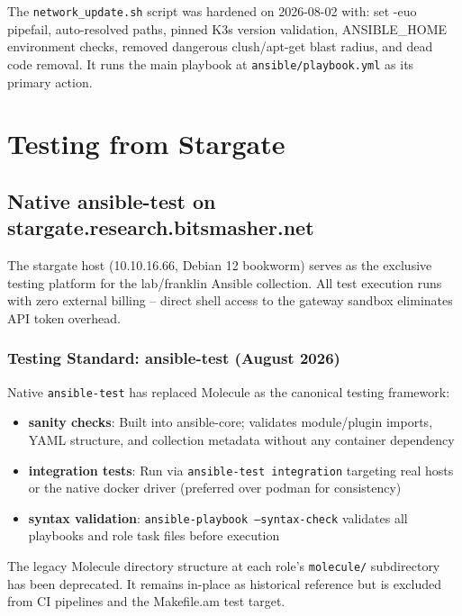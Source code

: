 The \texttt{network\_update.sh} script was hardened on 2026-08-02 with: set -euo pipefail, auto-resolved paths, pinned K3s version validation, ANSIBLE_HOME environment checks, removed dangerous clush/apt-get blast radius, and dead code removal. It runs the main playbook at \texttt{ansible/playbook.yml} as its primary action.

\chapter{Testing from Stargate}

\section{Native ansible-test on stargate.research.bitsmasher.net}

The stargate host (10.10.16.66, Debian 12 bookworm) serves as the exclusive testing platform for the lab/franklin Ansible collection. All test execution runs with zero external billing -- direct shell access to the gateway sandbox eliminates API token overhead.

\subsection{Testing Standard: ansible-test (August 2026)}

Native \texttt{ansible-test} has replaced Molecule as the canonical testing framework:

\begin{itemize}
    \item \textbf{sanity checks}: Built into ansible-core; validates module/plugin imports, YAML structure, and collection metadata without any container dependency
    
    \item \textbf{integration tests}: Run via \texttt{ansible-test integration} targeting real hosts or the native docker driver (preferred over podman for consistency)
    
    \item \textbf{syntax validation}: \texttt{ansible-playbook --syntax-check} validates all playbooks and role task files before execution
    
\end{itemize}

The legacy Molecule directory structure at each role's \texttt{molecule/} subdirectory has been deprecated. It remains in-place as historical reference but is excluded from CI pipelines and the Makefile.am test target.

